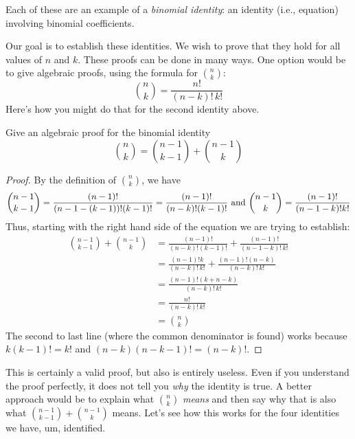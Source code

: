 \documentclass[12pt]{article}
\begin{document}
Each of these are an example of a {\em binomial identity}: an identity (i.e., equation) involving binomial coefficients.

Our goal is to establish these identities.  We wish to prove that they hold for all values of $n$ and $k$.  These proofs can be done in many ways.  One option would be to give algebraic proofs, using the formula for ${n \choose k}$:
\[{n \choose k} = \frac{n!}{(n-k)!\,k!}\]
Here's how you might do that for the second identity above.

\begin{example}
  Give an algebraic proof for the binomial identity
  \[{n \choose k} = {n-1\choose k-1} + {n-1 \choose k}\]
  \begin{proof}
    By the definition of ${n \choose k}$, we have
    \[{n-1 \choose k-1} = \frac{(n-1)!}{(n-1-(k-1))!(k-1)!} = \frac{(n-1)!}{(n-k)!(k-1)!} \hfill \mbox{ and } {n-1 \choose k} = \frac{(n-1)!}{(n-1-k)!k!}\]
    Thus, starting with the right hand side of the equation we are trying to establish:
    \begin{align*}
      {n-1 \choose k-1} + {n-1 \choose k} & = \frac{(n-1)!}{(n-k)!(k-1)!}+ \frac{(n-1)!}{(n-1-k)!\,k!}\\
      & = \frac{(n-1)!k}{(n-k)!\,k!} + \frac{(n-1)!(n-k)}{(n-k)!\,k!}\\
      & = \frac{(n-1)!(k+n-k)}{(n-k)!\,k!} \\
      & = \frac{n!}{(n-k)!\, k!} \\
      & = {n \choose k}
    \end{align*}
    The second to last line (where the common denominator is found) works because $k(k-1)! = k!$ and $(n-k)(n-k-1)! = (n-k)!$.
  \end{proof}

\end{example}

This is certainly a valid proof, but also is entirely useless.  Even if you understand the proof perfectly, it does not tell you {\em why} the identity is true.  A better approach would be to explain what ${n \choose k}$ {\em means} and then say why that is also what ${n-1 \choose k-1} + {n-1 \choose k}$ means.  Let's see how this works for the four identities we have, um, identified.
\end{document}
